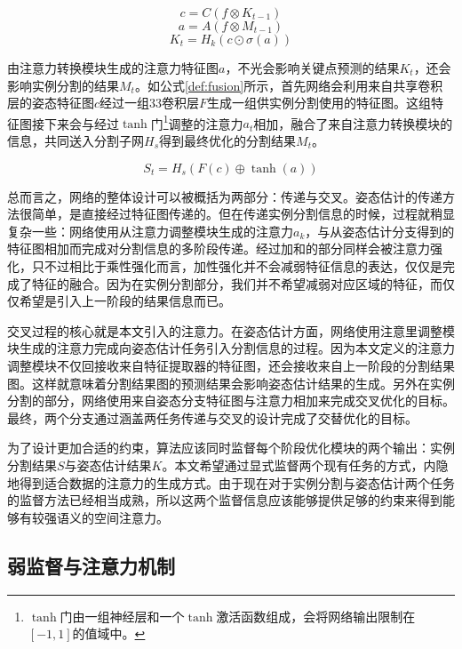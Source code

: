 \begin{equation}
\label{def:sharedconv}
c = C(f\otimes{K_{t-1}})
\end{equation}
\begin{equation}
\label{def:attenconverter}
a = A(f\otimes{M_{t-1}})
\end{equation}
\begin{equation}
\label{def:keypointhead}
K_t = H_k(c\odot \sigma(a))
\end{equation}

由注意力转换模块生成的注意力特征图$a$，不光会影响关键点预测的结果$K_t$，还会影响实例分割的结果$M_t$。如公式\eqref{def:fusion}所示，首先网络会利用来自共享卷积层的姿态特征图$c$经过一组3\times3卷积层$F$生成一组供实例分割使用的特征图。这组特征图接下来会与经过$\tanh$门\footnote{$\tanh$门由一组神经层和一个$\tanh$激活函数组成，会将网络输出限制在$[-1, 1]$的值域中。}调整的注意力$a_t$相加，融合了来自注意力转换模块的信息，共同送入分割子网$H_s$得到最终优化的分割结果$M_t$。

\begin{equation}
\label{def:fusion}
S_t = H_s(F(c) \oplus \tanh(a))
\end{equation}

总而言之，网络的整体设计可以被概括为两部分：传递与交叉。姿态估计的传递方法很简单，是直接经过特征图传递的。但在传递实例分割信息的时候，过程就稍显复杂一些：网络使用从注意力调整模块生成的注意力$a_k$，与从姿态估计分支得到的特征图相加而完成对分割信息的多阶段传递。经过加和的部分同样会被注意力强化，只不过相比于乘性强化而言，加性强化并不会减弱特征信息的表达，仅仅是完成了特征的融合。因为在实例分割部分，我们并不希望减弱对应区域的特征，而仅仅希望是引入上一阶段的结果信息而已。

交叉过程的核心就是本文引入的注意力。在姿态估计方面，网络使用注意里调整模块生成的注意力完成向姿态估计任务引入分割信息的过程。因为本文定义的注意力调整模块不仅回接收来自特征提取器的特征图，还会接收来自上一阶段的分割结果图。这样就意味着分割结果图的预测结果会影响姿态估计结果的生成。另外在实例分割的部分，网络使用来自姿态分支特征图与注意力相加来完成交叉优化的目标。最终，两个分支通过涵盖两任务传递与交叉的设计完成了交替优化的目标。

为了设计更加合适的约束，算法应该同时监督每个阶段优化模块的两个输出：实例分割结果$S$与姿态估计结果$K$。本文希望通过显式监督两个现有任务的方式，内隐地得到适合数据的注意力的生成方式。由于现在对于实例分割与姿态估计两个任务的监督方法已经相当成熟，所以这两个监督信息应该能够提供足够的约束来得到能够有较强语义的空间注意力。

\subsection{弱监督与注意力机制}
\label{subsec:weaksuper_attention}

